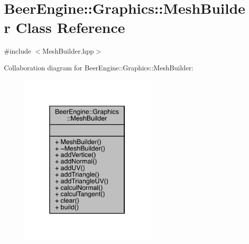 \hypertarget{class_beer_engine_1_1_graphics_1_1_mesh_builder}{}\section{Beer\+Engine\+:\+:Graphics\+:\+:Mesh\+Builder Class Reference}
\label{class_beer_engine_1_1_graphics_1_1_mesh_builder}


{\ttfamily \#include $<$Mesh\+Builder.\+hpp$>$}



Collaboration diagram for Beer\+Engine\+:\+:Graphics\+:\+:Mesh\+Builder\+:\nopagebreak
\begin{figure}[H]
\begin{center}
\leavevmode
\includegraphics[width=194pt]{class_beer_engine_1_1_graphics_1_1_mesh_builder__coll__graph}
\end{center}
\end{figure}
